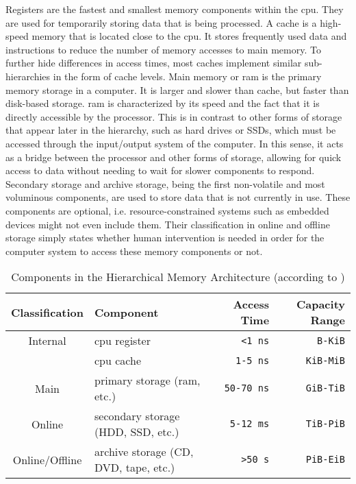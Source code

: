 Registers are the fastest and smallest memory components within the \ac{cpu}.
They are used for temporarily storing data that is being processed.
A cache is a high-speed memory that is located close to the \ac{cpu}.
It stores frequently used data and instructions to reduce the number of memory accesses to main memory.
To further hide differences in access times, most caches implement similar sub-hierarchies in the form of cache levels.
Main memory or \acf{ram} is the primary memory storage in a computer.
It is larger and slower than cache, but faster than disk-based storage.
\Ac{ram} is characterized by its speed and the fact that it is directly accessible by the processor.
This is in contrast to other forms of storage that appear later in the hierarchy, such as hard drives or SSDs, which must be accessed through the input/output system of the computer.
In this sense, it acts as a bridge between the processor and other forms of storage, allowing for quick access to data without needing to wait for slower components to respond.
Secondary storage and archive storage, being the first non-volatile and most voluminous components, are used to store data that is not currently in use.
These components are optional, i.e. resource-constrained systems such as embedded devices might not even include them.
Their classification in online and offline storage simply states whether human intervention is needed in order for the computer system to access these memory components or not.

\begin{table}
  \centering
  \begin{tabular}{|c|l|r|r|}
    \hline
    \textbf{Classification} & \textbf{Component} & \textbf{Access Time} & \textbf{Capacity Range} \\
    \hline
    Internal        & \acs{cpu} register                    & \texttt{<1 ns}    & \texttt{B-KiB}\\
                    & \acs{cpu} cache                       & \texttt{1-5 ns}   & \texttt{KiB-MiB}\\
    Main            & primary storage (\acs{ram}, etc.)     & \texttt{50-70 ns} & \texttt{GiB-TiB}\\
    Online          & secondary storage (HDD, SSD, etc.)    & \texttt{5-12 ms}  & \texttt{TiB-PiB}\\
    Online/Offline  & archive storage (CD, DVD, tape, etc.) & \texttt{>50 s}    & \texttt{PiB-EiB}\\
    \hline
  \end{tabular}
  \caption{Components in the Hierarchical Memory Architecture (according to \cite{memory-hierarchy1994, kumar-memory-hierarchy2018})}
  \label{tab:memory-hierarchy}
\end{table}


